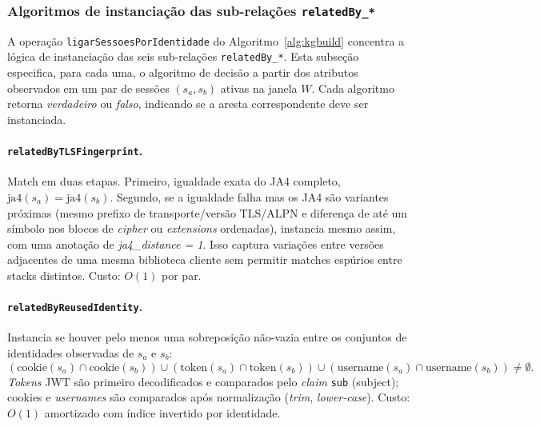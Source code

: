\documentclass[preprint,12pt]{elsarticle}
\begin{document}
\subsubsection{Algoritmos de instanciação das sub-relações \texttt{relatedBy\_*}}
\label{sec:approach:relatedby_algorithms}

A operação \texttt{ligarSessoesPorIdentidade} do Algoritmo~\ref{alg:kgbuild} concentra a lógica de instanciação das seis sub-relações \texttt{relatedBy\_*}. Esta subseção especifica, para cada uma, o algoritmo de decisão a partir dos atributos observados em um par de sessões $(s_a, s_b)$ ativas na janela $W$. Cada algoritmo retorna \emph{verdadeiro} ou \emph{falso}, indicando se a aresta correspondente deve ser instanciada.

\paragraph{\texttt{relatedByTLSFingerprint}.} Match em duas etapas. Primeiro, igualdade exata do JA4 completo, $\text{ja4}(s_a) = \text{ja4}(s_b)$. Segundo, se a igualdade falha mas os JA4 são variantes próximas (mesmo prefixo de transporte/versão TLS/ALPN e diferença de até um símbolo nos blocos de \emph{cipher} ou \emph{extensions} ordenadas), instancia mesmo assim, com uma anotação de \emph{ja4\_distance = 1}. Isso captura variações entre versões adjacentes de uma mesma biblioteca cliente sem permitir matches espúrios entre stacks distintos. Custo: $O(1)$ por par.

\paragraph{\texttt{relatedByReusedIdentity}.} Instancia se houver pelo menos uma sobreposição não-vazia entre os conjuntos de identidades observadas de $s_a$ e $s_b$:
\begin{equation*}
    (\text{cookie}(s_a) \cap \text{cookie}(s_b)) \cup (\text{token}(s_a) \cap \text{token}(s_b)) \cup (\text{username}(s_a) \cap \text{username}(s_b)) \neq \emptyset.
\end{equation*}
\emph{Tokens} JWT são primeiro decodificados e comparados pelo \emph{claim} \texttt{sub} (subject); cookies e \emph{usernames} são comparados após normalização (\emph{trim}, \emph{lower-case}). Custo: $O(1)$ amortizado com índice invertido por identidade.
\end{document}
